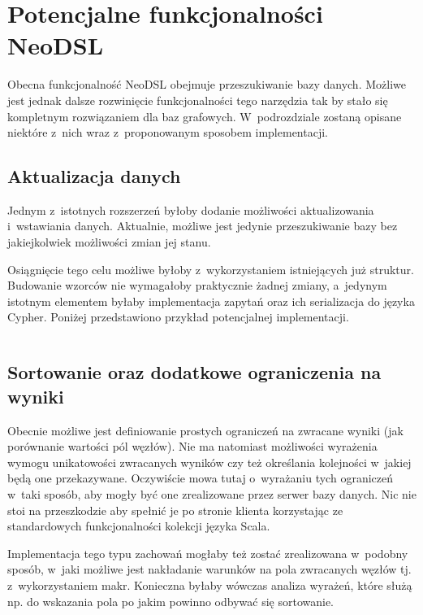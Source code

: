 \documentclass[brudnopis]{xmgr}
\begin{document}
\section{Potencjalne funkcjonalności NeoDSL}

Obecna funkcjonalność NeoDSL obejmuje przeszukiwanie bazy danych. Możliwe jest jednak dalsze rozwinięcie funkcjonalności tego narzędzia tak by stało się kompletnym rozwiązaniem dla baz grafowych. W~podrozdziale zostaną opisane niektóre z~nich wraz z~proponowanym sposobem implementacji.

\subsection{Aktualizacja danych}

Jednym z~istotnych rozszerzeń byłoby dodanie możliwości aktualizowania i~wstawiania danych. Aktualnie, możliwe jest jedynie przeszukiwanie bazy bez jakiejkolwiek możliwości zmian jej stanu. 

Osiągnięcie tego celu możliwe byłoby z~wykorzystaniem istniejących już struktur. Budowanie wzorców nie wymagałoby praktycznie żadnej zmiany, a~jedynym istotnym elementem byłaby implementacja zapytań oraz ich serializacja do języka Cypher. Poniżej przedstawiono przykład potencjalnej implementacji.

\inputminted{scala}{listings/scala/missing-features-update.scala}

\subsection{Sortowanie oraz dodatkowe ograniczenia na wyniki}

Obecnie możliwe jest definiowanie prostych ograniczeń na zwracane wyniki (jak porównanie wartości pól węzłów). Nie ma natomiast możliwości wyrażenia wymogu unikatowości zwracanych wyników czy też określania kolejności w~jakiej będą one przekazywane. Oczywiście mowa tutaj o~wyrażaniu tych ograniczeń w~taki sposób, aby mogły być one zrealizowane przez serwer bazy danych. Nic nie stoi na przeszkodzie aby spełnić je po stronie klienta korzystając ze standardowych funkcjonalności kolekcji języka Scala.

Implementacja tego typu zachowań mogłaby też zostać zrealizowana w~podobny sposób, w~jaki możliwe jest nakładanie warunków na pola zwracanych węzłów tj. z~wykorzystaniem makr. Konieczna byłaby wówczas analiza wyrażeń, które służą np. do wskazania pola po jakim powinno odbywać się sortowanie. 
\end{document}
